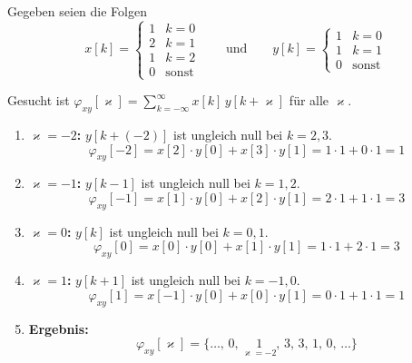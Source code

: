 \begin{beispiel}

Gegeben seien die Folgen
$$
x[k] = \begin{cases} 1 & k=0 \\ 2 & k=1 \\ 1 & k=2 \\ 0 & \text{sonst} \end{cases}
\qquad \text{und} \qquad
y[k] = \begin{cases} 1 & k=0 \\ 1 & k=1 \\ 0 & \text{sonst} \end{cases}
$$

Gesucht ist $\varphi_{xy}[\varkappa] = \sum_{k=-\infty}^{\infty} x[k]\,y[k+\varkappa]$ für alle $\varkappa$.

\begin{enumerate}
  \item \textbf{$\varkappa = -2$:} $y[k+(-2)]$ ist ungleich null bei $k = 2, 3$.
  $$\varphi_{xy}[-2] = x[2]\cdot y[0] + x[3]\cdot y[1] = 1\cdot 1 + 0\cdot 1 = 1$$

  \item \textbf{$\varkappa = -1$:} $y[k-1]$ ist ungleich null bei $k = 1, 2$.
  $$\varphi_{xy}[-1] = x[1]\cdot y[0] + x[2]\cdot y[1] = 2\cdot 1 + 1\cdot 1 = 3$$

  \item \textbf{$\varkappa = 0$:} $y[k]$ ist ungleich null bei $k = 0, 1$.
  $$\varphi_{xy}[0] = x[0]\cdot y[0] + x[1]\cdot y[1] = 1\cdot 1 + 2\cdot 1 = 3$$

  \item \textbf{$\varkappa = 1$:} $y[k+1]$ ist ungleich null bei $k = -1, 0$.
  $$\varphi_{xy}[1] = x[-1]\cdot y[0] + x[0]\cdot y[1] = 0\cdot 1 + 1\cdot 1 = 1$$

  \item \textbf{Ergebnis:}
  $$\varphi_{xy}[\varkappa] = \{\ldots,\, 0,\, \underset{\varkappa=-2}{1},\, 3,\, 3,\, 1,\, 0,\, \ldots\}$$
\end{enumerate}

\end{beispiel}

